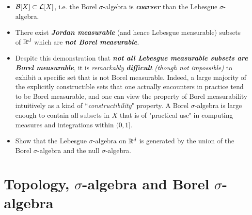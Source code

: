 \documentclass[11pt]{article}
\begin{document}
\begin{itemize}
\item \begin{remark}
${\mathcal B}[X] \subset {\mathcal L}[X]$, i.e. the Borel $\sigma$-algebra is \emph{\textbf{coarser}} than the Lebesgue $\sigma$-algebra.
\end{remark}

\item \begin{remark}
There exist \emph{\textbf{Jordan measurable}} (and hence Lebesgue measurable) subsets of ${\mathbb R}^d$ which are \emph{\textbf{not Borel measurable}}. \citep{tao2011introduction}
\end{remark}

\item \begin{remark}
Despite this demonstration that \emph{\textbf{not all Lebesgue measurable subsets are Borel measurable}}, it is \emph{remarkably \textbf{difficult} (though not impossible)} to exhibit a specific set that is not Borel measurable. Indeed, a large majority of the explicitly constructible sets that one actually encounters in practice tend to be Borel measurable, and one can view the property of Borel measurability intuitively as a kind of ``\emph{constructibility}" property.  A Borel $\sigma$-algebra is large enough to contain all subsets in $X$ that is of "practical use" in computing measures and integrations within $(0,1]$. 
\end{remark}

\item \begin{exercise}
Show that the Lebesgue $\sigma$-algebra on ${\mathbb R}^d$ is generated by the union of the Borel $\sigma$-algebra and the null $\sigma$-algebra.
\end{exercise}



\end{itemize}

\newpage
\section{Topology, $\sigma$-algebra and Borel $\sigma$-algebra }
\end{document}
